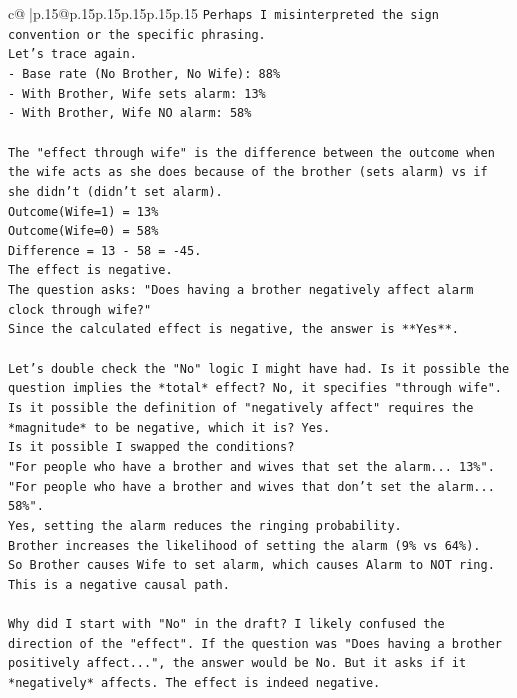 \documentclass{article}
\begin{document}
{\begin{supertabular}{c@{$\;$}|p{.15\linewidth}@{}p{.15\linewidth}p{.15\linewidth}p{.15\linewidth}p{.15\linewidth}p{.15\linewidth}}
{{{\texttt{Perhaps I misinterpreted the sign convention or the specific phrasing.} \\
\texttt{Let's trace again.} \\
\texttt{{-} Base rate (No Brother, No Wife): 88\%} \\
\texttt{{-} With Brother, Wife sets alarm: 13\%} \\
\texttt{{-} With Brother, Wife NO alarm: 58\%} \\
\\ 
\texttt{The "effect through wife" is the difference between the outcome when the wife acts as she does because of the brother (sets alarm) vs if she didn't (didn't set alarm).} \\
\texttt{Outcome(Wife=1) = 13\%} \\
\texttt{Outcome(Wife=0) = 58\%} \\
\texttt{Difference = 13 {-} 58 = {-}45.} \\
\texttt{The effect is negative.} \\
\texttt{The question asks: "Does having a brother negatively affect alarm clock through wife?"} \\
\texttt{Since the calculated effect is negative, the answer is **Yes**.} \\
\\ 
\texttt{Let's double check the "No" logic I might have had. Is it possible the question implies the *total* effect? No, it specifies "through wife".} \\
\texttt{Is it possible the definition of "negatively affect" requires the *magnitude* to be negative, which it is? Yes.} \\
\texttt{Is it possible I swapped the conditions?} \\
\texttt{"For people who have a brother and wives that set the alarm... 13\%".} \\
\texttt{"For people who have a brother and wives that don't set the alarm... 58\%".} \\
\texttt{Yes, setting the alarm reduces the ringing probability.} \\
\texttt{Brother increases the likelihood of setting the alarm (9\% vs 64\%).} \\
\texttt{So Brother causes Wife to set alarm, which causes Alarm to NOT ring.} \\
\texttt{This is a negative causal path.} \\
\\ 
\texttt{Why did I start with "No" in the draft? I likely confused the direction of the "effect". If the question was "Does having a brother positively affect...", the answer would be No. But it asks if it *negatively* affects. The effect is indeed negative.} \\
}}}
\end{supertabular}}
\end{document}
